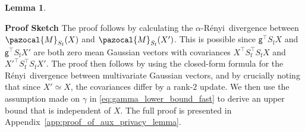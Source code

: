 \documentclass[11pt]{article}
\newtheorem{lem}{Lemma}
\theoremstyle{definition}
\theoremstyle{plain}
\providecommand{\appendixref}[1]{Appendix~\ref{#1}}
\newcommand{\pM}{\pazocal{M}}
\newcommand{\Renyi}{{\normalfont R\'enyi}~}
\begin{document}
\begin{lem}
\end{lem}

\textbf{Proof Sketch} \hskip3mm The proof follows by calculating the $\alpha$-\Renyi divergence between $\pM_{S_{\mathrm{f}}}(X)$ and $\pM_{S_{\mathrm{f}}}(X')$. This is possible since $\mathsf{g}^{\top}S_{\mathrm{f}}X$ and $\mathsf{g}^{\top}S_{\mathrm{f}}X'$ are both zero mean Gaussian vectors with covariances $X^{\top}S^{\top}_{\mathrm{f}}S_{\mathrm{f}}X$ and $X'^{\top}S^{\top}_{\mathrm{f}}S_{\mathrm{f}}X'$.
The proof then follows by using the closed-form formula for the \Renyi divergence between multivariate Gaussian vectors, and by crucially noting that since $X'\simeq X$, the covariances differ by a rank-$2$ update.
We then use the assumption made on $\gamma$ in \eqref{eq:gamma_lower_bound_fast} to derive an upper bound that is independent of $X$.
The full proof is presented in \appendixref{app:proof_of_aux_privacy_lemma}. 
\end{document}
